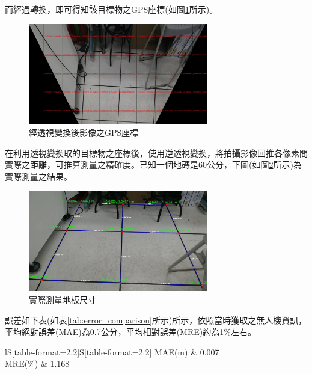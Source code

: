 \documentclass[12pt]{article}       %
\begin{document}
而經過轉換，即可得知該目標物之GPS座標(如圖\ref{fig:44}所示)。
\begin{figure}[H]
    \centering
    \includegraphics[width=0.7\textwidth]{44.jpg}     %
    \caption{經透視變換後影像之GPS座標}    %
    \label{fig:44}    %
\end{figure}

在利用透視變換取的目標物之座標後，使用逆透視變換，將拍攝影像回推各像素間實際之距離，可推算測量之精確度。已知一個地磚是60公分，下圖(如圖\ref{fig:frame_with_points_real}所示)為實際測量之結果。

\begin{figure}[H]
    \centering
    \includegraphics[width=0.7\textwidth]{frame_with_points_real.jpg}     %
    \caption{實際測量地板尺寸}    %
    \label{fig:frame_with_points_real}    %
\end{figure}

誤差如下表(如表\ref{tab:error_comparison}所示)所示，依照當時獲取之無人機資訊，平均絕對誤差(MAE)為0.7公分，平均相對誤差(MRE)約為1$\%$左右。

\begin{table}[H]
    \centering
    \caption{透視變換誤差}
    \vspace{6pt} %
    \label{tab:error_comparison}
    \begin{tabular}{lS[table-format=2.2]S[table-format=2.2]}
        \toprule
        MAE(m) & 0.007  \\
        MRE(\%) & 1.168 \\
        \bottomrule
    \end{tabular}
\end{table}
\end{document}
